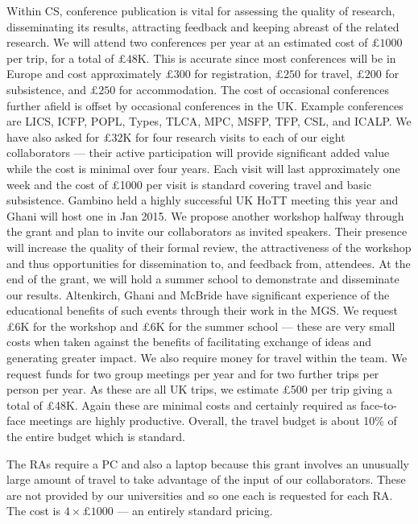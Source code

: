 \documentclass[a4paper,11pt]{article}
\begin{document}
 Within CS, conference publication is
vital for assessing the quality of research, disseminating its
results, attracting feedback and keeping abreast of the related
research.  We will attend two conferences per year at an estimated
cost of $\pounds 1000$ per trip, for a total of $\pounds 48$K. This is
accurate since most conferences will be in Europe and cost
approximately $\pounds 300$ for registration, $\pounds 250$ for
travel, $\pounds 200$ for subsistence, and $\pounds 250$ for
accommodation. The cost of occasional conferences further afield is
offset by occasional conferences in the UK. Example conferences are
LICS, ICFP, POPL, Types, TLCA, MPC, MSFP, TFP, CSL, and ICALP.  We
have also asked for $\pounds 32$K for four research visits to each of
our eight collaborators --- their active participation will provide
significant added value while the cost is minimal over four
years. Each visit will last approximately
one week and the cost of \pounds 1000 per visit is standard covering travel and basic
subsistence. Gambino held a highly successful UK HoTT meeting this
year and Ghani will host one in Jan 2015. We propose another workshop
halfway through the grant and plan to invite our collaborators as
invited speakers.  Their presence will increase the quality of
their formal review, the attractiveness of the workshop and thus
opportunities for dissemination to, and feedback from, attendees. At
the end of the grant, we will hold a summer school to demonstrate and
disseminate our results. Altenkirch, Ghani and McBride have
significant experience of the educational benefits of such events
through their work in the MGS. We request \pounds 6K for the workshop
and \pounds 6K for the summer school --- these are very small costs
when taken against the benefits of facilitating exchange of ideas and
generating greater impact. We also require money for travel within the
team. We request funds for two group meetings per year and for two
further trips per person per year. As these are all UK trips, we
estimate \pounds 500 per trip giving a total of \pounds 48K. Again
these are minimal costs and certainly required as face-to-face
meetings are highly productive. Overall, the travel budget is about
10\% of the entire budget which is standard.

\vspace{0.02in}

 The RAs require a PC and also a
laptop because this grant involves an unusually large amount of travel to take
advantage of the input of our collaborators. These are not provided by
our universities and so one each is requested for each RA. The cost is
$4\times\pounds1000$ --- an entirely standard
pricing.
\end{document}

